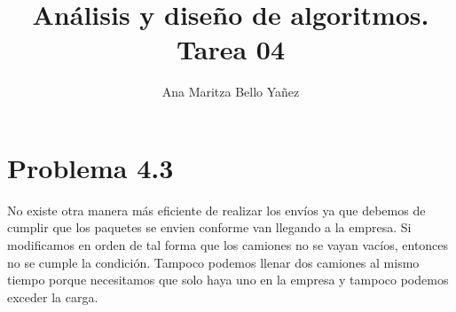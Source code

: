 \documentclass{article}
\begin{document}
\title{Análisis y diseño de algoritmos. \\ Tarea 04}
\author{Ana Maritza Bello Yañez}
\maketitle
\setlength{\parindent}{0pt}
\setlength{\parskip}{1em}

\section*{Problema 4.3}
% 
% 

No existe otra manera más eficiente de realizar los envíos ya que debemos de
cumplir que los paquetes se envien conforme van llegando a la empresa. Si
modificamos en orden de tal forma que los camiones no se vayan vacíos, entonces
no se cumple la condición. Tampoco podemos llenar dos camiones al mismo tiempo
porque necesitamos que solo haya uno en la empresa y tampoco podemos exceder la carga.
\end{document}
